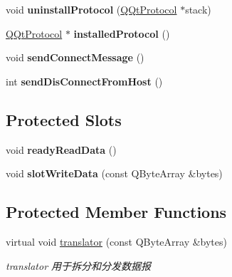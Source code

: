 \begin{DoxyCompactItemize}
\item 
\mbox{\label{class_q_qt_bluetooth_client_a225095ec6f89d9a81ff5f5e87c068c75}} 
void {\bfseries uninstall\+Protocol} (\mbox{\hyperlink{class_q_qt_protocol}{Q\+Qt\+Protocol}} $\ast$stack)
\item 
\mbox{\label{class_q_qt_bluetooth_client_ad41e0a81c9939260ea7da95545264822}} 
\mbox{\hyperlink{class_q_qt_protocol}{Q\+Qt\+Protocol}} $\ast$ {\bfseries installed\+Protocol} ()
\item 
\mbox{\label{class_q_qt_bluetooth_client_a1ef60b12e53dd6271c8526dafc0f58ae}} 
void {\bfseries send\+Connect\+Message} ()
\item 
\mbox{\label{class_q_qt_bluetooth_client_a65f06c44aab36597deab62c9a99412f2}} 
int {\bfseries send\+Dis\+Connect\+From\+Host} ()
\end{DoxyCompactItemize}
\subsection*{Protected Slots}
\begin{DoxyCompactItemize}
\item 
\mbox{\label{class_q_qt_bluetooth_client_a487991e7b8cf27c00d4e68e789d63564}} 
void {\bfseries ready\+Read\+Data} ()
\item 
\mbox{\label{class_q_qt_bluetooth_client_a4f74d5c8730112f3d126041f7ed1d384}} 
void {\bfseries slot\+Write\+Data} (const Q\+Byte\+Array \&bytes)
\end{DoxyCompactItemize}
\subsection*{Protected Member Functions}
\begin{DoxyCompactItemize}
\item 
virtual void \mbox{\hyperlink{class_q_qt_bluetooth_client_a5494c96ebf9c8a489000c1d44e059e85}{translator}} (const Q\+Byte\+Array \&bytes)
\begin{DoxyCompactList}\small\item\em translator 用于拆分和分发数据报 \end{DoxyCompactList}\end{DoxyCompactItemize}


